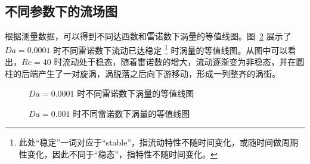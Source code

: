 \subsection{不同参数下的流场图}

根据测量数据，可以得到不同达西数和雷诺数下涡量的等值线图。图~\ref{fig: vorticity contour} 展示了 $Da=0.0001$ 时不同雷诺数下流动已达稳定 \footnote{此处“稳定”一词对应于“stable”，指流动特性不随时间变化，或随时间做周期性变化，因此不同于“稳态”，指特性不随时间变化。} 时涡量的等值线图。从图中可以看出，$Re=40$ 时流动处于稳态，随着雷诺数的增大，流动逐渐变为非稳态，并在圆柱的后端产生了一对旋涡，涡脱落之后向下游移动，形成一列整齐的涡街。


\begin{figure}
	\centering
	\begin{minipage}{\textwidth}
		\centering
	\end{minipage}
	\centering
	\begin{minipage}{\textwidth}
		\centering
	\end{minipage}
	\centering
	\begin{minipage}{\textwidth}
		\centering
	\end{minipage}
	\caption{$Da=0.0001$ 时不同雷诺数下涡量的等值线图}
	\label{fig: vorticity contour}
\end{figure}

\begin{figure}
	\centering
	\begin{minipage}{\textwidth}
		\centering
	\end{minipage}
	\centering
	\begin{minipage}{\textwidth}
		\centering
	\end{minipage}
	\centering
	\begin{minipage}{\textwidth}
		\centering
	\end{minipage}
	\caption{$Da=0.001$ 时不同雷诺数下涡量的等值线图}
	\label{fig: vorticity contour}
\end{figure}

